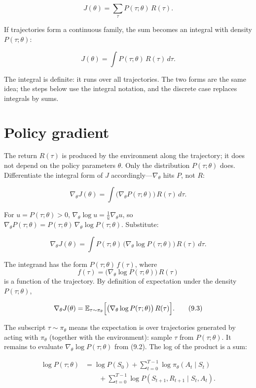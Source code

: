 \[
J(\theta)
=
\sum_{\tau} P(\tau;\theta)\,R(\tau).
\]

If trajectories form a continuous family, the sum becomes an integral with density $P(\tau;\theta)$:

\[
J(\theta)
=
\int P(\tau;\theta)\,R(\tau)\,d\tau.
\]

The integral is definite: it runs over all trajectories. The two forms are the same idea; the steps below use the integral notation, and the discrete case replaces integrals by sums.

\section{Policy gradient}

The return $R(\tau)$ is produced by the environment along the trajectory; it does not depend on the policy parameters $\theta$. Only the distribution $P(\tau;\theta)$ does. Differentiate the integral form of $J$ accordingly---$\nabla_\theta$ hits $P$, not $R$:

\[
\nabla_\theta J(\theta)
=
\int \bigl(\nabla_\theta P(\tau;\theta)\bigr)\,R(\tau)\,d\tau.
\]

For $u=P(\tau;\theta)>0$, $\nabla_\theta\log u=\frac{1}{u}\nabla_\theta u$, so $\nabla_\theta P(\tau;\theta)=P(\tau;\theta)\,\nabla_\theta\log P(\tau;\theta)$. Substitute:

\[
\nabla_\theta J(\theta)
=
\int P(\tau;\theta)\,\bigl(\nabla_\theta\log P(\tau;\theta)\bigr)\,R(\tau)\,d\tau.
\]

The integrand has the form $P(\tau;\theta)\,f(\tau)$, where \[
f(\tau)
=
\bigl(\nabla_\theta\log P(\tau;\theta)\bigr)\,R(\tau)
\] is a function of the trajectory. By definition of expectation under the density $P(\tau;\theta)$,

\begin{equation}
\nabla_\theta J(\theta)
=
\mathbb{E}_{\tau\sim\pi_\theta}\Bigl[
\bigl(\nabla_\theta\log P(\tau;\theta)\bigr)\,R(\tau)
\Bigr].
\tag{9.3}
\end{equation}

The subscript $\tau\sim\pi_\theta$ means the expectation is over trajectories generated by acting with $\pi_\theta$ (together with the environment): sample $\tau$ from $P(\tau;\theta)$. It remains to evaluate $\nabla_\theta\log P(\tau;\theta)$ from (9.2). The log of the product is a sum:

\begin{equation}
\begin{aligned}
\log P(\tau;\theta)
&=
\log P(S_0)
+
\sum_{t=0}^{T-1}\log\pi_\theta(A_t\mid S_t)
\\
&\qquad
+
\sum_{t=0}^{T-1}\log P(S_{t+1},R_{t+1}\mid S_t,A_t).
\end{aligned}
\tag{9.4}
\end{equation}

